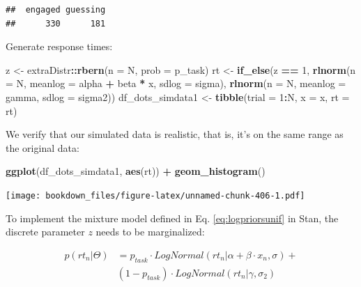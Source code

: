 \documentclass[12pt,]{krantz}
\newenvironment{Shaded}{\begin{snugshade}}{\end{snugshade}}
\newcommand{\DataTypeTok}[1]{\textcolor[rgb]{0.13,0.29,0.53}{#1}}
\newcommand{\DecValTok}[1]{\textcolor[rgb]{0.00,0.00,0.81}{#1}}
\newcommand{\KeywordTok}[1]{\textcolor[rgb]{0.13,0.29,0.53}{\textbf{#1}}}
\newcommand{\NormalTok}[1]{#1}
\newcommand{\OperatorTok}[1]{\textcolor[rgb]{0.81,0.36,0.00}{\textbf{#1}}}
\newcommand{\StringTok}[1]{\textcolor[rgb]{0.31,0.60,0.02}{#1}}
\theoremstyle{definition}
\theoremstyle{definition}
\theoremstyle{definition}
\theoremstyle{remark}
\begin{document}
\begin{verbatim}
##  engaged guessing 
##      330      181
\end{verbatim}

Generate response times:

\begin{Shaded}
\begin{Highlighting}[]
\NormalTok{z <-}\StringTok{ }\NormalTok{extraDistr}\OperatorTok{::}\KeywordTok{rbern}\NormalTok{(}\DataTypeTok{n =}\NormalTok{ N, }\DataTypeTok{prob =}\NormalTok{ p_task)}
\NormalTok{rt <-}\StringTok{ }\KeywordTok{if_else}\NormalTok{(z }\OperatorTok{==}\StringTok{ }\DecValTok{1}\NormalTok{,}
             \KeywordTok{rlnorm}\NormalTok{(}\DataTypeTok{n =}\NormalTok{ N, }\DataTypeTok{meanlog =}\NormalTok{ alpha }\OperatorTok{+}\StringTok{ }\NormalTok{beta }\OperatorTok{*}\StringTok{ }\NormalTok{x, }\DataTypeTok{sdlog =}\NormalTok{ sigma),}
             \KeywordTok{rlnorm}\NormalTok{(}\DataTypeTok{n =}\NormalTok{ N, }\DataTypeTok{meanlog =}\NormalTok{ gamma, }\DataTypeTok{sdlog =}\NormalTok{ sigma2))}
\NormalTok{df_dots_simdata1 <-}\StringTok{ }\KeywordTok{tibble}\NormalTok{(}\DataTypeTok{trial =} \DecValTok{1}\OperatorTok{:}\NormalTok{N, }\DataTypeTok{x =}\NormalTok{ x, }\DataTypeTok{rt =}\NormalTok{ rt)}
\end{Highlighting}
\end{Shaded}

We verify that our simulated data is realistic, that is, it's on the same range as the original data:

\begin{Shaded}
\begin{Highlighting}[]
\KeywordTok{ggplot}\NormalTok{(df_dots_simdata1, }\KeywordTok{aes}\NormalTok{(rt)) }\OperatorTok{+}
\StringTok{  }\KeywordTok{geom_histogram}\NormalTok{()}
\end{Highlighting}
\end{Shaded}

\texttt{[image: bookdown\_files/figure-latex/unnamed-chunk-406-1.pdf]}

To implement the mixture model defined in Eq. \eqref{eq:logpriorsunif} in Stan, the discrete parameter \(z\) needs to be marginalized:

\begin{equation}
\begin{aligned}
p(rt_n | \Theta) &= p_{task} \cdot LogNormal(rt_n | \alpha + \beta \cdot x_n, \sigma) +\\ 
    & (1 - p_{task}) \cdot LogNormal(rt_n | \gamma, \sigma_2)
\end{aligned}
\end{equation}
\end{document}
